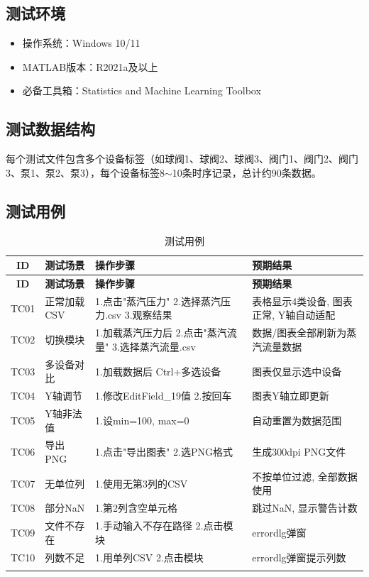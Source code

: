 \documentclass[12pt,a3paper]{ctexart}
\begin{document}
\subsection{测试环境}

\begin{itemize}
    \item 操作系统：Windows 10/11
    \item MATLAB版本：R2021a及以上
    \item 必备工具箱：Statistics and Machine Learning Toolbox
\end{itemize}

\subsection{测试数据结构}

每个测试文件包含多个设备标签（如球阀1、球阀2、球阀3、阀门1、阀门2、阀门3、泵1、泵2、泵3），每个设备标签8$\sim$10条时序记录，总计约90条数据。

\subsection{测试用例}

\begin{longtable}{c|l|l|l}
\toprule
\textbf{ID} & \textbf{测试场景} & \textbf{操作步骤} & \textbf{预期结果} \\
\midrule
\endfirsthead
\toprule
\textbf{ID} & \textbf{测试场景} & \textbf{操作步骤} & \textbf{预期结果} \\
\midrule
\endhead

TC01 & 正常加载CSV & 1.点击"蒸汽压力" 2.选择蒸汽压力.csv 3.观察结果 & 表格显示4类设备, 图表正常, Y轴自动适配 \\
\hline
TC02 & 切换模块 & 1.加载蒸汽压力后 2.点击"蒸汽流量" 3.选择蒸汽流量.csv & 数据/图表全部刷新为蒸汽流量数据 \\
\hline
TC03 & 多设备对比 & 1.加载数据后 Ctrl+多选设备 & 图表仅显示选中设备 \\
\hline
TC04 & Y轴调节 & 1.修改EditField\_19值 2.按回车 & 图表Y轴立即更新 \\
\hline
TC05 & Y轴非法值 & 1.设min=100, max=0 & 自动重置为数据范围 \\
\hline
TC06 & 导出PNG & 1.点击"导出图表" 2.选PNG格式 & 生成300dpi PNG文件 \\
\hline
TC07 & 无单位列 & 1.使用无第3列的CSV & 不按单位过滤, 全部数据使用 \\
\hline
TC08 & 部分NaN & 1.第2列含空单元格 & 跳过NaN, 显示警告计数 \\
\hline
TC09 & 文件不存在 & 1.手动输入不存在路径 2.点击模块 & errordlg弹窗 \\
\hline
TC10 & 列数不足 & 1.用单列CSV 2.点击模块 & errordlg弹窗提示列数 \\
\hline
\bottomrule
\caption{测试用例}
\end{longtable}
\end{document}

